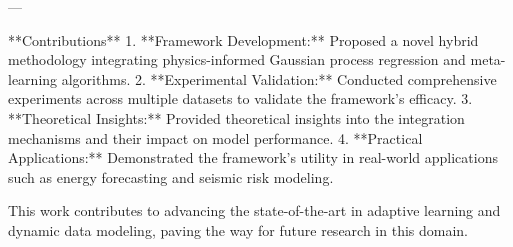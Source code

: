 ---

**Contributions**  
1. **Framework Development:** Proposed a novel hybrid methodology integrating physics-informed Gaussian process regression and meta-learning algorithms.  
2. **Experimental Validation:** Conducted comprehensive experiments across multiple datasets to validate the framework's efficacy.  
3. **Theoretical Insights:** Provided theoretical insights into the integration mechanisms and their impact on model performance.  
4. **Practical Applications:** Demonstrated the framework's utility in real-world applications such as energy forecasting and seismic risk modeling.  

This work contributes to advancing the state-of-the-art in adaptive learning and dynamic data modeling, paving the way for future research in this domain.
